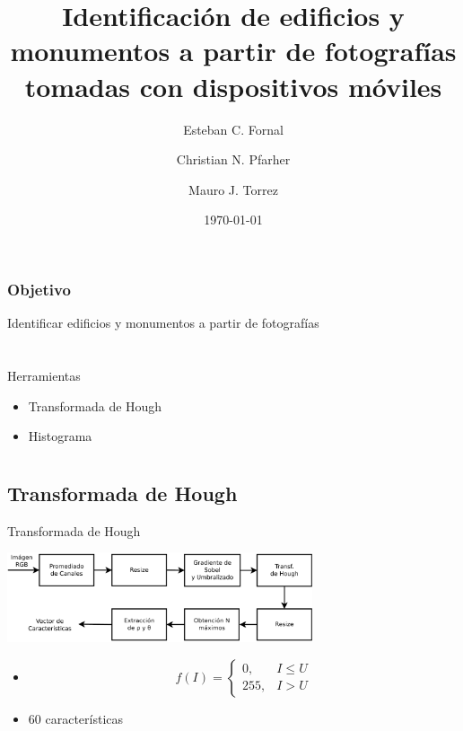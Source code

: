 \documentclass[spanish]{beamer}
\title{Identificación de edificios y monumentos a partir de fotografías tomadas 
con dispositivos móviles}
\author{Esteban C. Fornal \and Christian N. Pfarher \and Mauro J. Torrez}
\date{\today}
\begin{document}
%
\frame{\titlepage}

\section[Objetivo]{}

\begin{frame}{}
\frametitle{Objetivo}
Identificar edificios y monumentos a partir de fotografías
\end{frame}

\section[Herramientas utilizadas]{}

\begin{frame}{Herramientas}
\begin{itemize}
\item<1-> Transformada de Hough
\item<2-> Histograma
\end{itemize}
\end{frame}

\section[Técnicas utilizadas]{}
\subsection{Transformada de Hough}
\begin{frame}{Transformada de Hough}
\begin{center}  \includegraphics[width=9cm]{../diagramas/procesohough} \end{center}

  \begin{itemize}
  \item[]\begin{center}
    \begin{equation*}
      \label{umbral}
      f(I)=
      \begin{cases}
      0, & I\leq U\\
      255, & I > U
      \end{cases}
      \end{equation*}
      \end {center}
  \item 60 características
  \end{itemize}
\end{frame}
\end{document}
